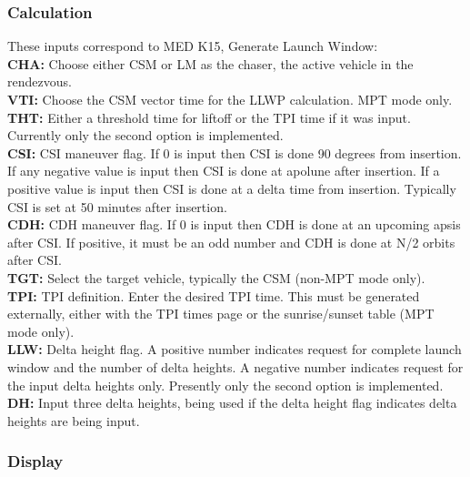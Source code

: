 \documentclass[11pt]{article} %
\begin{document}
\subsubsection{Calculation}

These inputs correspond to MED K15, Generate Launch Window:\\

\textbf{CHA:} Choose either CSM or LM as the chaser, the active vehicle in the rendezvous.\\
\textbf{VTI:} Choose the CSM vector time for the LLWP calculation. MPT mode only.\\
\textbf{THT:} Either a threshold time for liftoff or the TPI time if it was input. Currently only the second option is implemented.\\
\textbf{CSI:} CSI maneuver flag. If 0 is input then CSI is done 90 degrees from insertion. If any negative value is input then CSI is done at apolune after insertion. If a positive value is input then CSI is done at a delta time from insertion. Typically CSI is set at 50 minutes after insertion.\\
\textbf{CDH:} CDH maneuver flag. If 0 is input then CDH is done at an upcoming apsis after CSI. If positive, it must be an odd number and CDH is done at N/2 orbits after CSI.\\

\textbf{TGT:} Select the target vehicle, typically the CSM (non-MPT mode only).\\
\textbf{TPI:} TPI definition. Enter the desired TPI time. This must be generated externally, either with the TPI times page or the sunrise/sunset table (MPT mode only).\\
\textbf{LLW:} Delta height flag. A positive number indicates request for complete launch window and the number of delta heights. A negative number indicates request for the input delta heights only. Presently only the second option is implemented.\\
\textbf{DH:} Input three delta heights, being used if the delta height flag indicates delta heights are being input.\\
\subsubsection{Display}
\end{document}
